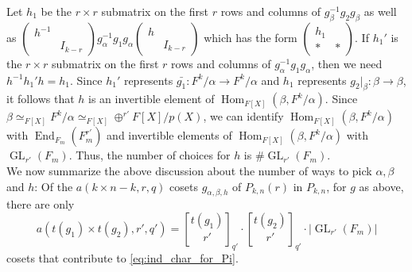 \documentclass[reqno]{amsart}
\theoremstyle{definition}
\theoremstyle{remark}
\numberwithin{equation}{section}
\newcommand{\stirling}[2]{\genfrac{[}{]}{0pt}{1}{#1}{#2}}
\DeclareMathOperator{\Hom}{Hom}
\DeclareMathOperator{\GL}{GL}
\DeclareMathOperator{\End}{End}
\newcommand{\bbsm}{\left (\begin{smallmatrix}}      \newcommand{\besm}{\end{smallmatrix}\right )}
\begin{document}
Let $h_1$ be the $r \times r$ submatrix  on the first $r$ rows and columns of $g_\beta^{-1} g_2 g_\beta$ as well as $\bbsm h^{-1} & \\ & I_{k-r} \besm g_\alpha^{-1} g_1 g_\alpha \bbsm h &\\&I_{k-r} \besm $ which has the form $\bbsm h_1 & \\\ast & \ast \besm$. If $h_1'$  is the $r \times r$ submatrix  on the first $r$ rows and columns of $ g_\alpha^{-1} g_1 g_\alpha$, then we need $h^{-1}h_1'h=h_1$. Since $h_1'$ represents $\bar{g_1}:F^k/\alpha \to F^k/\alpha$ and $h_1$ represents $g_2|_\beta: \beta \to \beta$, it follows that $h$ is an invertible element of 
$\Hom_{F[X]}(\beta, F^k/\alpha)$. Since $\beta \simeq_{F[X]} F^k/\alpha \simeq_{F[X]} \oplus^{r'} F[X]/p(X)$, we can identify $\Hom_{F[X]}(\beta, F^k/\alpha)$  with $\End_{F_m}(F_m^{r'})$ and invertible elements of $\Hom_{F[X]}(\beta, F^k/\alpha)$ with $\GL_{r'}(F_m)$. Thus, the number of choices for $h$ is $\# \GL_{r'}(F_m)$. \\

 We now summarize the above discussion about the number of ways to pick $\alpha, \beta$ and $h$: Of  the $a(k \times n-k,r,q)$ cosets $g_{\alpha, \beta, h}$ of $P_{k,n}(r)$ in $P_{k,n}$, for $g$ as above, there are  only 
\[ a(t(g_1) \times t(g_2), r',q')=\stirling{t(g_1)}{r'}_{q'} \cdot \stirling{t(g_2)}{r'}_{q'}\cdot |\GL_{r'}(F_m)|\]
cosets that contribute to \eqref{eq:ind_char_for_Pi}.\\
\end{document}
